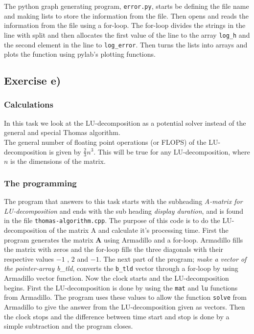 \documentclass{article}
\begin{document}
    The python graph generating program, \texttt{error.py}, starts be defining the file name and making lists to store the information from the file. Then opens and reads the information from the file using a for-loop. The for-loop divides the strings in the line with split and then allocates the first value of the line to the array \texttt{log\_h} and the second element in the line to \texttt{log\_error}. Then turns the lists into arrays and plots the function using pylab's plotting functions.


\subsection{Exercise e)} \label{Method e)}


  \subsubsection{Calculations}

    In this task we look at the LU-decomposition as a potential solver instead of the general and special Thomas algorithm. \\

    The general number of floating point operations (or FLOPS) of the LU-decomposition is given by $ \frac{2}{3} n^3$. This will be true for any LU-decomposition, where $n$ is the dimensions of the matrix.


  \subsubsection{The programming}


    The program that answers to this task starts with the subheading \textit{A-matrix for LU-decomposition} and ends with the sub heading \textit{display duration}, and is found in the file \texttt{thomas-algorithm.cpp}. The purpose of this code is to do the LU-decomposition of the matrix A and calculate it's processing time. First the program generates the matrix \textbf{A} using Armadillo and a for-loop. Armadillo fills the matrix with zeros and the for-loop fills the three diagonals with their respective values $-1$ , $2$ and $ -1$. The next part of the program; \textit{make a vector of the pointer-array b\_tld}, converts the \texttt{b\_tld} vector through a for-loop by using Armadillo vector function. Now the clock starts and the LU-decomposition begins. First the LU-decomposition is done by using the \texttt{mat} and \texttt{lu} functions from Armadillo. The program uses these values to allow the function \texttt{solve} from Armadillo to give the answer from the LU-decomposition given as vectors. Then the clock stops and the difference between time start and stop is done by a simple subtraction and the program closes. \\
\end{document}
